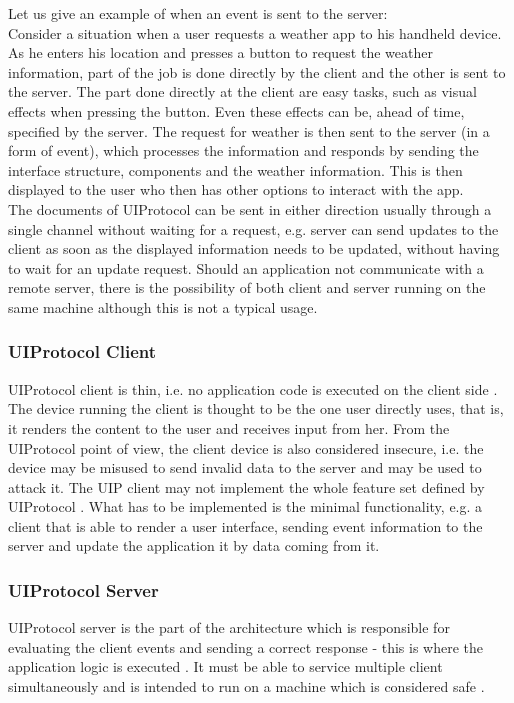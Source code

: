 Let us give an example of when an event is sent to the server:\\
Consider a situation when a user requests a weather app to his handheld device. As he enters his location and presses a button to request the weather information, part of the job is done directly by the client and the other is sent to the server. The part done directly at the client are easy tasks, such as visual effects when pressing the button. Even these effects can be, ahead of time, specified by the server. The request for weather is then sent to the server (in a form of event), which processes the information and responds by sending the interface structure, components and the weather information. This is then displayed to the user who then has other options to interact with the app.\\
The documents of UIProtocol can be sent in either direction usually through a single channel without waiting for a request, e.g. server can send updates to the client as soon as the displayed information needs to be updated, without having to wait for an update request. Should an application not communicate with a remote server, there is the possibility of both client and server running on the same machine although this is not a typical usage.

\subsubsection{UIProtocol Client}
UIProtocol client is thin, i.e. no application code is executed on the client side \cite{uip}. The device running the client is thought to be the one user directly uses, that is, it renders the content to the user and receives input from her. From the UIProtocol point of view, the client device is also considered insecure, i.e. the device may be misused to send invalid data to the server and may be used to attack it. The UIP client may not implement the whole feature set defined by UIProtocol \cite{uip}. What has to be implemented is the minimal functionality, e.g. a client that is able to render a user interface, sending event information to the server and update the application it by data coming from it.

\subsubsection{UIProtocol Server}
UIProtocol server is the part of the architecture which is responsible for evaluating the client events and sending a correct response - this is where the application logic is executed \cite{uip}. It must be able to service multiple client simultaneously and is intended to run on a machine which is considered safe \cite{uip}.

